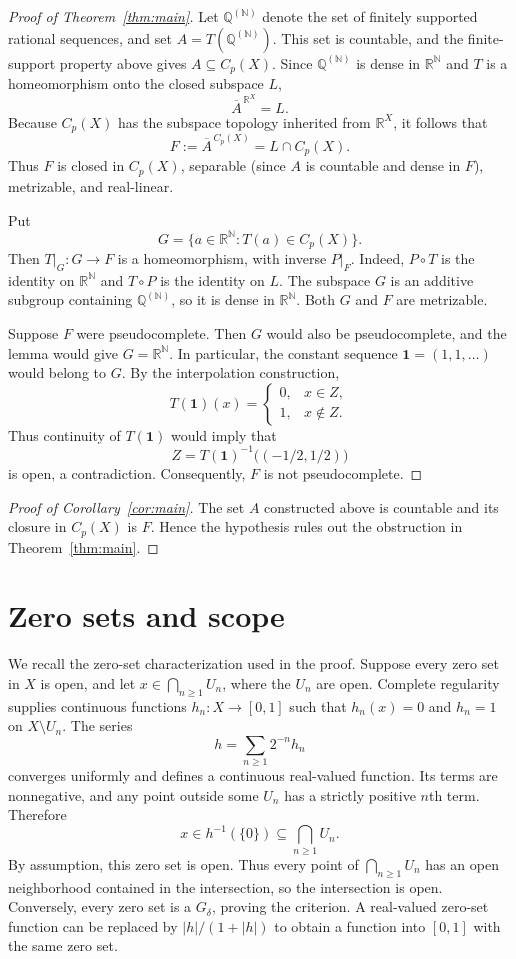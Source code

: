 \documentclass{amsart}
\theoremstyle{remark}
\newcommand{\R}{\mathbb{R}}
\newcommand{\N}{\mathbb{N}}
\newcommand{\Q}{\mathbb{Q}}
\newcommand{\one}{\mathbf{1}}
\begin{document}
\begin{proof}[Proof of Theorem~\ref{thm:main}]
Let $\Q^{(\N)}$ denote the set of finitely supported rational sequences, and set $A=T(\Q^{(\N)})$. This set is countable, and the finite-support property above gives $A\subseteq C_p(X)$. Since $\Q^{(\N)}$ is dense in $\R^{\N}$ and $T$ is a homeomorphism onto the closed subspace $L$,
\[
\overline{A}^{\,\R^X}=L.
\]
Because $C_p(X)$ has the subspace topology inherited from $\R^X$, it follows that
\[
F:=\overline{A}^{\,C_p(X)}=L\cap C_p(X).
\]
Thus $F$ is closed in $C_p(X)$, separable (since $A$ is countable and dense in $F$), metrizable, and real-linear.

Put
\[
G=\{a\in\R^{\N} : T(a)\in C_p(X)\}.
\]
Then $T|_G\colon G\to F$ is a homeomorphism, with inverse $P|_F$. Indeed, $P\circ T$ is the identity on $\R^{\N}$ and $T\circ P$ is the identity on $L$. The subspace $G$ is an additive subgroup containing $\Q^{(\N)}$, so it is dense in $\R^{\N}$. Both $G$ and $F$ are metrizable.

Suppose $F$ were pseudocomplete. Then $G$ would also be pseudocomplete, and the lemma would give $G=\R^{\N}$. In particular, the constant sequence $\one=(1,1,\ldots)$ would belong to $G$. By the interpolation construction,
\[
T(\one)(x)=
\begin{cases}
0, & x\in Z,\\
1, & x\notin Z.
\end{cases}
\]
Thus continuity of $T(\one)$ would imply that
\[
Z=T(\one)^{-1}\bigl((-1/2,1/2)\bigr)
\]
is open, a contradiction. Consequently, $F$ is not pseudocomplete.
\end{proof}

\begin{proof}[Proof of Corollary~\ref{cor:main}]
The set $A$ constructed above is countable and its closure in $C_p(X)$ is $F$. Hence the hypothesis rules out the obstruction in Theorem~\ref{thm:main}.
\end{proof}

\section{Zero sets and scope}\label{sec:zero}

We recall the zero-set characterization used in the proof. Suppose every zero set in $X$ is open, and let $x\in\bigcap_{n\geq 1}U_n$, where the $U_n$ are open. Complete regularity supplies continuous functions $h_n\colon X\to[0,1]$ such that $h_n(x)=0$ and $h_n=1$ on $X\setminus U_n$. The series
\[
h=\sum_{n\geq 1}2^{-n}h_n
\]
converges uniformly and defines a continuous real-valued function. Its terms are nonnegative, and any point outside some $U_n$ has a strictly positive $n$th term. Therefore
\[
x\in h^{-1}(\{0\})\subseteq\bigcap_{n\geq 1}U_n.
\]
By assumption, this zero set is open. Thus every point of $\bigcap_{n\geq 1}U_n$ has an open neighborhood contained in the intersection, so the intersection is open. Conversely, every zero set is a $G_\delta$, proving the criterion. A real-valued zero-set function can be replaced by $|h|/(1+|h|)$ to obtain a function into $[0,1]$ with the same zero set.
\end{document}
